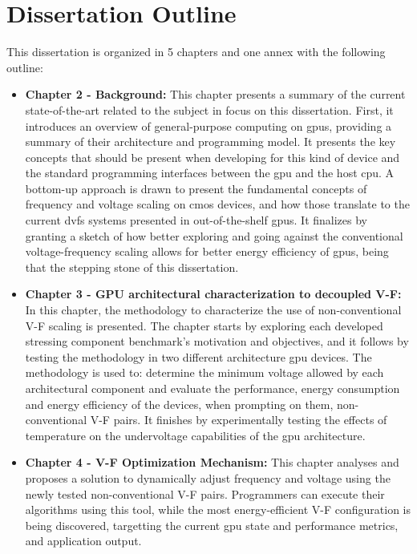 \section{Dissertation Outline}
\label{section:outline}

This dissertation is organized in 5 chapters and one annex with the following outline:
\begin{itemize}
    \item \textbf{Chapter 2 - Background:} This chapter presents a summary of the current state-of-the-art related to the subject in focus on this dissertation. First, it introduces an overview of general-purpose computing on \acrshort{gpu}s, providing a summary of their architecture and programming model. It presents the key concepts that should be present when developing for this kind of device and the standard programming interfaces between the \acrshort{gpu} and the host  \acrshort{cpu}. A bottom-up approach is drawn to present the fundamental concepts of frequency and voltage scaling on \acrshort{cmos} devices, and how those translate to the current \acrshort{dvfs} systems presented in out-of-the-shelf \acrshort{gpu}s. It finalizes by granting a sketch of how better exploring and going against the conventional voltage-frequency scaling allows for better energy efficiency of \acrshort{gpu}s, being that the stepping stone of this dissertation. 
    \item \textbf{Chapter 3 - GPU architectural characterization to decoupled V-F:} In this chapter, the methodology to characterize the use of non-conventional V-F scaling is presented. The chapter starts by exploring each developed stressing component benchmark's motivation and objectives, and it follows by testing the methodology in two different architecture \acrshort{gpu} devices. The methodology is used to: determine the minimum voltage allowed by each architectural component and evaluate the performance, energy consumption and energy efficiency of the devices, when prompting on them, non-conventional V-F pairs. It finishes by experimentally testing the effects of temperature on the undervoltage capabilities of the \acrshort{gpu} architecture.
    \item \textbf{Chapter 4 - V-F Optimization Mechanism:} This chapter analyses and proposes a solution to dynamically adjust frequency and voltage using the newly tested non-conventional V-F pairs. Programmers can execute their algorithms using this tool, while the most energy-efficient V-F configuration is being discovered, targetting the current \acrshort{gpu} state and performance metrics, and application output.

\end{itemize}

